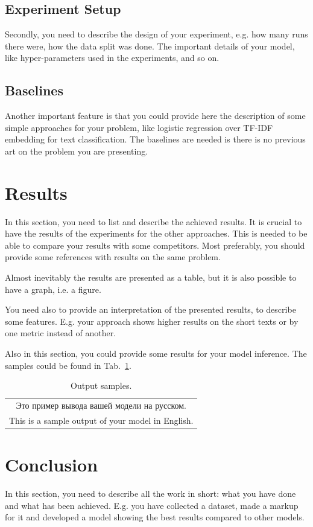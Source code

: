 \documentclass{article}
\begin{document}
\subsection{Experiment Setup}
Secondly, you need to describe the design of your experiment, e.g. how many runs there were, how the data split was done. The important details of your model, like hyper-parameters used in the experiments, and so on.

\subsection{Baselines}
Another important feature is that you could provide here the description of some simple approaches for your problem, like logistic regression over TF-IDF embedding for text classification. The baselines are needed is there is no previous art on the problem you are presenting.

\section{Results}
In this section, you need to list and describe the achieved results. It is crucial to have the results of the experiments for the other approaches. This is needed to be able to compare your results with some competitors. Most preferably, you should provide some references with results on the same problem.

Almost inevitably the results are presented as a table, but it is also possible to have a graph, i.e. a figure.

You need also to provide an interpretation of the presented results, to describe some features. E.g. your approach shows higher results on the short texts or by one metric instead of another.

Also in this section, you could provide some results for your model inference. The samples could be found in Tab.~\ref{tab:output}.

\begin{table}[!tbh]
    \centering
    \begin{tabular}{|c|}
\hline
Это пример вывода вашей модели на русском.\\
This is a sample output of your model in English.
\\
\hline
    \end{tabular}
    \caption{Output samples.}
    \label{tab:output}
\end{table}

\section{Conclusion}
In this section, you need to describe all the work in short: what you have done and what has been achieved. E.g. you have collected a dataset, made a markup for it and developed a model showing the best results compared to other models. 



\end{document}
